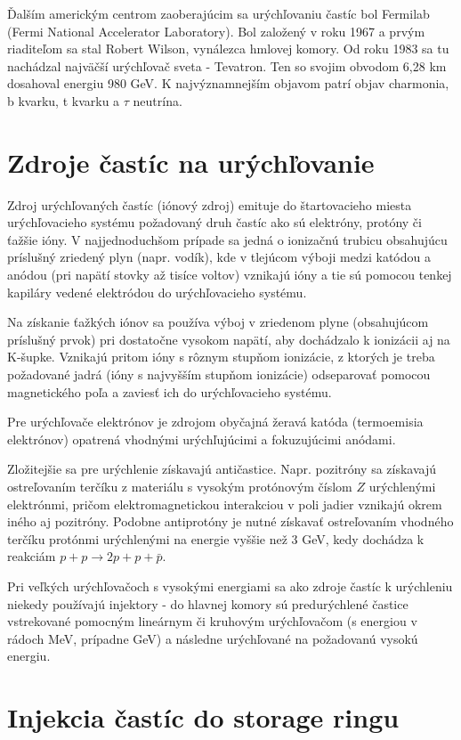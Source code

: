 \documentclass[../../main.tex]{subfiles}
\begin{document}
Ďalším americkým centrom zaoberajúcim sa urýchľovaniu častíc bol Fermilab (Fermi National Accelerator Laboratory). Bol založený v roku 1967 a prvým riaditeľom sa stal Robert Wilson, vynálezca hmlovej komory. Od roku 1983 sa tu nachádzal najväčší urýchľovač sveta - Tevatron. Ten so svojim obvodom 6,28 km dosahoval energiu 980 GeV. K najvýznamnejším objavom patrí objav charmonia, b kvarku, t kvarku a $\tau$ neutrína.

\section{Zdroje častíc na urýchľovanie}

Zdroj urýchľovaných častíc (iónový zdroj) emituje do štartovacieho miesta urýchľovacieho systému požadovaný druh častíc ako sú elektróny, protóny či ťažšie ióny. V najjednoduchšom prípade sa jedná o ionizačnú trubicu obsahujúcu príslušný zriedený plyn (napr. vodík), kde v tlejúcom výboji medzi katódou a anódou (pri napätí stovky až tisíce voltov) vznikajú ióny a tie sú pomocou tenkej kapiláry vedené elektródou do urýchľovacieho systému.

Na získanie ťažkých iónov sa používa výboj v zriedenom plyne (obsahujúcom príslušný prvok) pri dostatočne vysokom napätí, aby dochádzalo k ionizácii aj na K-šupke. Vznikajú pritom ióny s rôznym stupňom ionizácie, z ktorých je treba požadované jadrá (ióny s najvyšším stupňom ionizácie) odseparovať pomocou magnetického poľa a zaviesť ich do urýchľovacieho systému.

Pre urýchľovače elektrónov je zdrojom obyčajná žeravá katóda (termoemisia elektrónov) opatrená vhodnými urýchľujúcimi a fokuzujúcimi anódami.

Zložitejšie sa pre urýchlenie získavajú antičastice. Napr. pozitróny sa získavajú ostreľovaním terčíku z materiálu s vysokým protónovým číslom $Z$ urýchlenými elektrónmi, pričom elektromagnetickou interakciou v poli jadier vznikajú okrem iného aj pozitróny. Podobne antiprotóny je nutné získavať ostreľovaním vhodného terčíku protónmi urýchlenými na energie vyššie než 3 GeV, kedy dochádza k reakciám $p+p\rightarrow 2p+p+\bar{p}$.

Pri veľkých urýchľovačoch s vysokými energiami sa ako zdroje častíc k urýchleniu niekedy používajú injektory - do hlavnej komory sú predurýchlené častice vstrekované pomocným lineárnym či kruhovým urýchľovačom (s energiou v rádoch MeV, prípadne GeV) a následne urýchľované na požadovanú vysokú energiu.

\section{Injekcia častíc do storage ringu}
\end{document}
